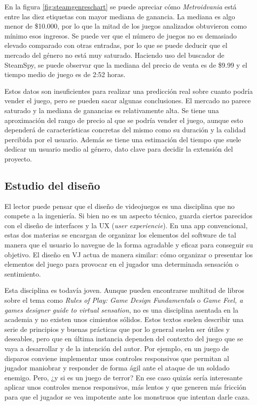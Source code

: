 En la figura \ref{fig:steamgenreschart} se puede apreciar cómo \textit{Metroidvania} está entre las diez etiquetas con mayor mediana de ganancia. La mediana es algo menor de \$10.000, por lo que la mitad de los juegos analizados obtuvieron como mínimo esos ingresos. Se puede ver que el número de juegos no es demasiado elevado comparado con otras entradas, por lo que se puede deducir que el mercado del género no está muy saturado. Haciendo uso del buscador de SteamSpy, se puede observar que la mediana del precio de venta es de \$9.99 y el tiempo medio de juego es de 2:52 horas.

Estos datos son insuficientes para realizar una predicción real sobre cuanto podría vender el juego, pero se pueden sacar algunas conclusiones. El mercado no parece saturado y la mediana de ganancias es relativamente alta. Se tiene una aproximación del rango de precio al que se podría vender el juego, aunque esto dependerá de características concretas del mismo como su duración y la calidad percibida por el usuario. Además se tiene una estimación del tiempo que suele dedicar un usuario medio al género, dato clave para decidir la extensión del proyecto.

\subsection{Estudio del diseño}

El lector puede pensar que el diseño de videojuegos es una disciplina que no compete a la ingeniería. Si bien no es un aspecto técnico, guarda ciertos parecidos con el diseño de interfaces y la UX (\textit{user experiencie}). En una app convencional, estas dos materias se encargan de organizar los elementos del software de tal manera que el usuario lo navegue de la forma agradable y eficaz para conseguir su objetivo. El diseño en VJ actua de manera similar: cómo organizar o presentar los elementos del juego para provocar en el jugador una determinada sensación o sentimiento.

Esta disciplina es todavía joven. Aunque pueden encontrarse multitud de libros sobre el tema como \textit{Rules of Play: Game Design Fundamentals}\cite{rules-of-play} o \textit{Game Feel, a games designer guide to virtual sensation}\cite{gamefeel}, no es una disciplina asentada en la academia y no existen unos cimientos sólidos. Estos textos suelen describir una serie de principios y buenas prácticas que por lo general suelen ser útiles y deseables, pero que en última instancia dependen del contexto del juego que se vaya a desarrollar y de la intención del autor. Por ejemplo, en un juego de disparos conviene implementar unos controles responsivos que permitan al jugador maniobrar y responder de forma ágil ante el ataque de un soldado enemigo. Pero, ¿y si es un juego de terror? En ese caso quizás sería interesante aplicar unos controles menos responsivos, más lentos y que generen más fricción para que el jugador se vea impotente ante los monstruos que intentan darle caza.

